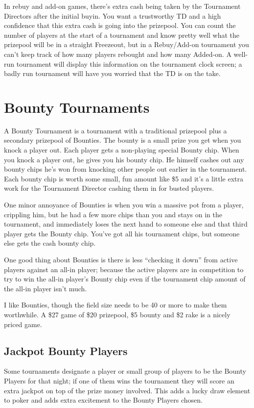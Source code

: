 In rebuy and add-on games, there's extra cash being taken by
the Tournament Directors after the initial buyin. You want
a trustworthy TD and a high confidence that this extra cash is
going into the prizepool. You can count the number of players
at the start of a tournament and know pretty well what the prizepool
will be in a straight Freezeout, but in a Rebuy/Add-on tournament
you can't keep track of how many players rebought and how
many Added-on. A well-run tournament will display this
information on the tournament clock screen; a badly run tournament
will have you worried that the TD is on the take.

\section{Bounty Tournaments}

A Bounty Tournament is a tournament with a traditional prizepool
plus a secondary prizepool of Bounties. The bounty
is a small prize you get when you knock a player out.
Each player gets a non-playing special Bounty chip.
When you knock a player out, he gives you his bounty chip.
He himself cashes out any bounty chips he's won from knocking
other people out earlier in the tournament. Each bounty chip is worth
some small, fun amount like \$5 and it's a little extra work for the
Tournament Director cashing them in for busted players.

One minor annoyance of Bounties is when you win a massive pot
from a player, crippling him, but he had a few more chips than
you and stays on in the tournament, and immediately loses the
next hand to someone else and that third player gets the
Bounty chip. You've got all his tournament chips, but someone
else gets the cash bounty chip.

One good thing about Bounties is there is less ``checking it down''
from active players against an all-in player; because the active
players are in competition to try to win the all-in player's
Bounty chip even if the tournament chip amount of the all-in player
isn't much.

I like Bounties, though the field size needs to be 40 or more to
make them worthwhile. A \$27 game of \$20 prizepool, \$5 bounty
and \$2 rake is a nicely priced game.

\subsection{Jackpot Bounty Players}

Some tournaments designate a player or small group of players
to be the Bounty Players for that night; if one of them wins
the tournament they will score an extra jackpot on top of
the prize money involved. This adds a lucky draw element to
poker and adds extra excitement to the Bounty Players chosen.

